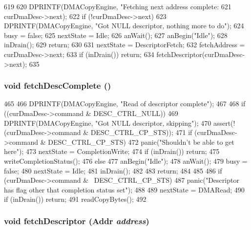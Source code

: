 \begin{DoxyCode}
619 {
620     DPRINTF(DMACopyEngine, "Fetching next address complete: %
621             curDmaDesc->next);
622     if (!curDmaDesc->next) {
623         DPRINTF(DMACopyEngine, "Got NULL descriptor, nothing more to do\n");
624         busy = false;
625         nextState = Idle;
626         anWait();
627         anBegin("Idle");
628         inDrain();
629         return;
630     }
631     nextState = DescriptorFetch;
632     fetchAddress = curDmaDesc->next;
633     if (inDrain()) return;
634     fetchDescriptor(curDmaDesc->next);
635 }
\end{DoxyCode}
\hypertarget{classCopyEngine_1_1CopyEngineChannel_a603f8a373e26c50ac5daa350afde3355}{
\subsubsection[{fetchDescComplete}]{\setlength{\rightskip}{0pt plus 5cm}void fetchDescComplete ()}}
\label{classCopyEngine_1_1CopyEngineChannel_a603f8a373e26c50ac5daa350afde3355}



\begin{DoxyCode}
465 {
466     DPRINTF(DMACopyEngine, "Read of descriptor complete\n");
467 
468     if ((curDmaDesc->command & DESC_CTRL_NULL)) {
469         DPRINTF(DMACopyEngine, "Got NULL descriptor, skipping\n");
470         assert(!(curDmaDesc->command & DESC_CTRL_CP_STS));
471         if (curDmaDesc->command & DESC_CTRL_CP_STS) {
472             panic("Shouldn't be able to get here\n");
473             nextState = CompletionWrite;
474             if (inDrain()) return;
475             writeCompletionStatus();
476         } else {
477             anBegin("Idle");
478             anWait();
479             busy = false;
480             nextState = Idle;
481             inDrain();
482         }
483         return;
484     }
485 
486     if (curDmaDesc->command & ~DESC_CTRL_CP_STS)
487         panic("Descriptor has flag other that completion status set\n");
488 
489     nextState = DMARead;
490     if (inDrain()) return;
491     readCopyBytes();
492 }
\end{DoxyCode}
\hypertarget{classCopyEngine_1_1CopyEngineChannel_ade0b28ef4d83eab52f66f236473fb486}{
\subsubsection[{fetchDescriptor}]{\setlength{\rightskip}{0pt plus 5cm}void fetchDescriptor ({\bf Addr} {\em address})}}
\label{classCopyEngine_1_1CopyEngineChannel_ade0b28ef4d83eab52f66f236473fb486}



